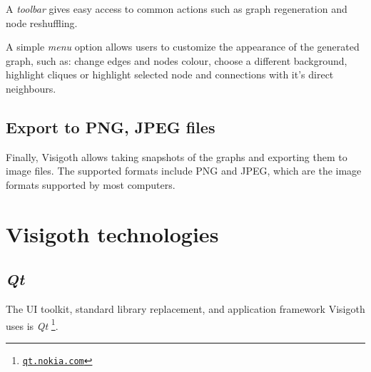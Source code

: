 \documentclass[a4paper,11pt,titlepage]{article}
\let\stdhref\href
\renewcommand{\href}[2]{\stdhref{#1}{\texttt{#2}}}
\let\stdsection\section         %
\renewcommand{\section}{\newpage\stdsection}
\newcommand{\buzz}[1]{\emph{#1}}
\newcommand{\myhref}[1]{\href{http://#1}{#1}}
\newcommand{\Qt}{\buzz{Qt} }
\begin{document}
A \emph{toolbar} gives easy access to common actions such as graph regeneration and
node reshuffling.

A simple \emph{menu} option allows users to customize the appearance of the generated graph,
such as: change edges and nodes colour, choose a different background, highlight
cliques or highlight selected node and connections with it's direct neighbours.

\subsection{Export to PNG, JPEG files}
Finally, Visigoth allows taking snapshots of the graphs and exporting them to image files. The supported formats include PNG and JPEG, which are the image formats supported by most computers.

\section{Visigoth technologies}

\subsection{\Qt}

The UI toolkit, standard library replacement, and application
framework Visigoth uses is \Qt\footnote{\myhref{qt.nokia.com}}.
\end{document}
